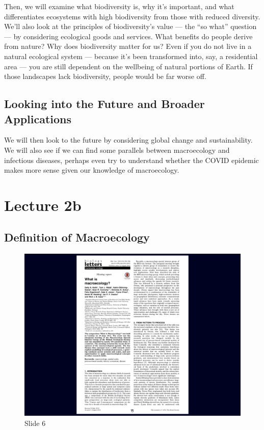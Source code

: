\documentclass[
  12pt,
]{book}
\begin{document}
Then, we will examine what biodiversity is, why it's important, and what
differentiates ecosystems with high biodiversity from those with reduced
diversity. We'll also look at the principles of biodiversity's value ---
the ``so what'' question --- by considering ecological goods and
services. What benefits do people derive from nature? Why does
biodiversity matter for us? Even if you do not live in a natural
ecological system --- because it's been transformed into, say, a
residential area --- you are still dependent on the wellbeing of natural
portions of Earth. If those landscapes lack biodiversity, people would
be far worse off.

\section{Looking into the Future and Broader
Applications}\label{looking-into-the-future-and-broader-applications}

We will then look to the future by considering global change and
sustainability. We will also see if we can find some parallels between
macroecology and infectious diseases, perhaps even try to understand
whether the COVID epidemic makes more sense given our knowledge of
macroecology.

\chapter*{Lecture 2b}\label{lecture-2b}

\section{Definition of Macroecology}\label{definition-of-macroecology}

\begin{figure}[ht]
\centering
\includegraphics[width=0.8\linewidth]{../images/BDC334/BDC334-006.jpeg}
\caption*{Slide 6}
\end{figure}
\end{document}
